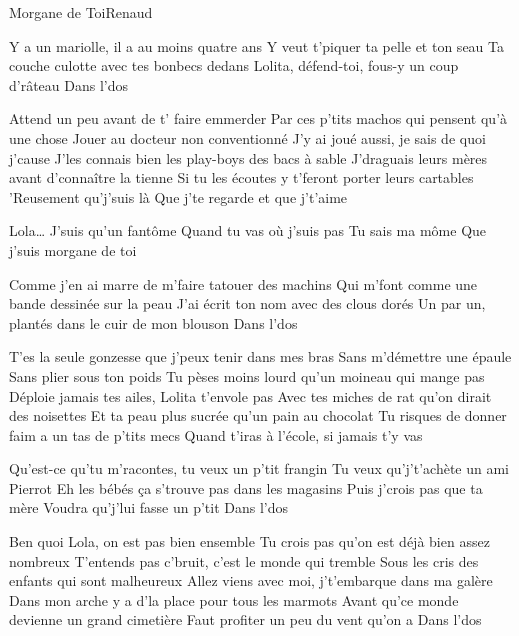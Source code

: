 \documentclass[a4paper,11pt,french]{article}
\begin{document}
\begin{Song}{Morgane de Toi}{Renaud}
\begin{multicols}{2}
\begin{Verse}
Y a un mariolle, il a au moins quatre ans
Y veut t'piquer ta pelle et ton seau
Ta couche culotte avec tes bonbecs dedans
Lolita, défend-toi, fous-y un coup d'râteau 
Dans l'dos
\espaceInterStrophe

Attend un peu avant de t' faire emmerder
Par ces p'tits machos qui pensent qu'à une chose
Jouer au docteur non conventionné
J'y ai joué aussi, je sais de quoi j'cause
J'les connais bien les play-boys des bacs à sable
J'draguais leurs mères avant d'connaître la tienne
Si tu les écoutes y t'feront porter leurs cartables
'Reusement qu'j'suis là
Que j'te regarde et que j't'aime
\end{Verse}
\espaceInterStrophe

\begin{Chorus}
Lola\dots
J'suis qu'un fantôme 
Quand tu vas où j'suis pas
Tu sais ma môme
Que j'suis morgane de toi
\end{Chorus}
\espaceInterStrophe

\begin{Verse}
Comme j'en ai marre de m'faire tatouer des machins
Qui m'font comme une bande dessinée sur la peau
J'ai écrit ton nom avec des clous dorés
Un par un, plantés dans le cuir de mon blouson 
Dans l'dos
\vfill
\columnbreak

T'es la seule gonzesse que j'peux tenir dans mes bras
Sans m'démettre une épaule
Sans plier sous ton poids
Tu pèses moins lourd qu'un moineau qui mange pas
Déploie jamais tes ailes, Lolita t'envole pas
Avec tes miches de rat qu'on dirait des noisettes
Et ta peau plus sucrée qu'un pain au chocolat
Tu risques de donner faim a un tas de p'tits mecs
Quand t'iras à l'école, si jamais t'y vas
\end{Verse}
\espaceInterStrophe

\aurefrain
\espaceInterStrophe

\begin{Verse}
Qu'est-ce qu'tu m'racontes, tu veux un p'tit frangin
Tu veux qu'j't'achète un ami Pierrot
Eh les bébés ça s'trouve pas dans les magasins
Puis j'crois pas que ta mère 
Voudra qu'j'lui fasse un p'tit 
Dans l'dos
\espaceInterStrophe

Ben quoi Lola, on est pas bien ensemble
Tu crois pas qu'on est déjà bien assez nombreux
T'entends pas c'bruit, c'est le monde qui tremble
Sous les cris des enfants qui sont malheureux
Allez viens avec moi, j't'embarque dans ma galère
Dans mon arche y a d'la place pour tous les marmots
Avant qu'ce monde devienne un grand cimetière
Faut profiter un peu du vent qu'on a 
Dans l'dos
\end{Verse}
\espaceInterStrophe


\end{multicols}
\end{Song}
\end{document}
